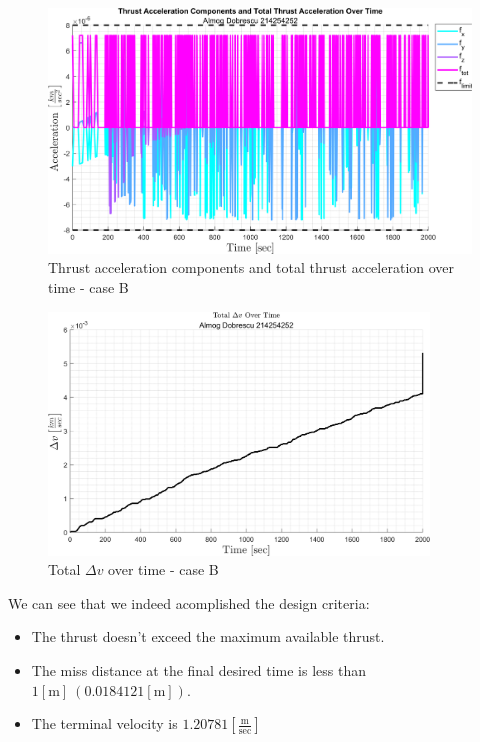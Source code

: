 \documentclass[11pt, a4paper]{article}
\begin{document}
\begin{figure}[H]
    \centering
    \includegraphics[width=1\textwidth]{images/graph7.png}
    \caption{Thrust acceleration components and total thrust acceleration over time - case B}
    \label{fig:accel_over_time-caseB}
\end{figure}
\begin{figure}[H]
    \centering
    \includegraphics[width=0.9\textwidth]{images/graph8.png}
    \caption{Total $\Delta v$ over time - case B}
    \label{fig:delta_v_over_time-caseB}
\end{figure}
We can see that we indeed acomplished the design criteria:
\begin{itemize}
    \item The thrust doesn't exceed the maximum available thrust.
    \item The miss distance at the final desired time is less than $1[\mathrm{m}]\ \left(0.0184121\left[\mathrm{m}\right]\right)$.
    \item The terminal velocity is $1.20781\left[\displaystyle\frac{\mathrm{m}}{\mathrm{sec}}\right]$
\end{itemize}
\end{document}
